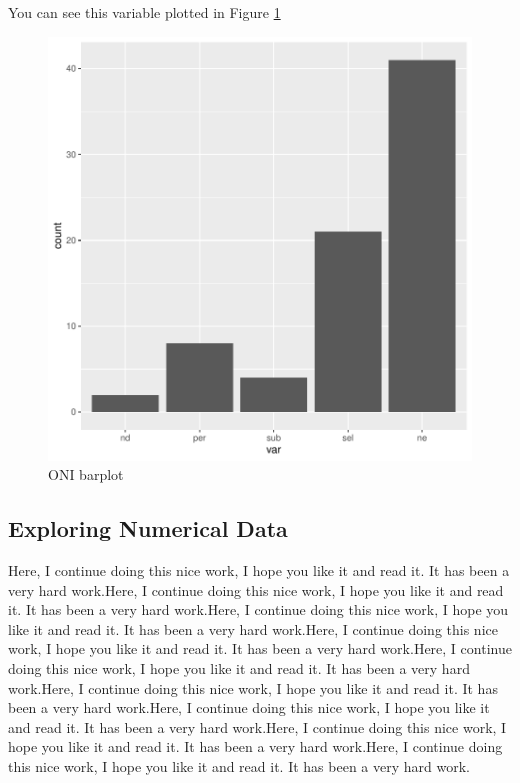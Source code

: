\documentclass[11pt]{article}
\begin{document}
You can see this variable plotted in Figure \ref{catexplore_plot}



\begin{figure}[h]
\centering
\begin{adjustbox}{width=7cm,height=5cm}
\includegraphics{PaperInR_5-cat_plot}
\end{adjustbox}
\caption{ONI barplot}  %
\label{catexplore_plot} %
\end{figure}





\subsection{Exploring Numerical Data}\label{numexplo}

Here, I continue doing this nice work, I hope you like it and read it. It has been a very hard work.Here, I continue doing this nice work, I hope you like it and read it. It has been a very hard work.Here, I continue doing this nice work, I hope you like it and read it. It has been a very hard work.Here, I continue doing this nice work, I hope you like it and read it. It has been a very hard work.Here, I continue doing this nice work, I hope you like it and read it. It has been a very hard work.Here, I continue doing this nice work, I hope you like it and read it. It has been a very hard work.Here, I continue doing this nice work, I hope you like it and read it. It has been a very hard work.Here, I continue doing this nice work, I hope you like it and read it. It has been a very hard work.Here, I continue doing this nice work, I hope you like it and read it. It has been a very hard work.
\end{document}
